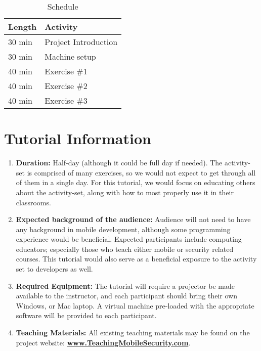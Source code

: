 \documentclass[titlepage]{article}
\begin{document}
%


\begin{table}[ht]%
\begin{center}
\caption{Schedule}
\label{Table:apkcontents}
  \begin{tabular}{| l | l | } \hline

    \bfseries Length & \bfseries Activity \\ \hline
    30 min & Project Introduction \\ \hline
    30 min & Machine setup \\ \hline
    40 min & Exercise \#1 \\ \hline
    40 min & Exercise \#2 \\ \hline
    40 min & Exercise \#3 \\ \hline

  \end{tabular}
  \end{center}
\end{table}









\section{Tutorial Information}

\begin{enumerate}
	\item \textbf{Duration:} Half-day (although it could be full day if needed). The activity-set is comprised of many exercises, so we would not expect to get through all of them in a single day. For this tutorial, we would focus on educating others about the activity-set, along with how to most properly use it in their classrooms. 
	
	\item \textbf{Expected background of the audience:} Audience will not need to have any background in mobile development, although some programming experience would be beneficial. Expected participants include computing educators; especially those who teach either mobile or security related courses. This tutorial would also serve as a beneficial exposure to the activity set to developers as well.
	\item \textbf{Required Equipment:} The tutorial will require a projector be made available to the instructor, and each participant should bring their own Windows, or Mac laptop. A virtual machine pre-loaded with the appropriate software will be provided to each participant.
	
	
	\item \textbf{Teaching Materials:} All existing teaching materials may be found on the project website: \textbf{\url{www.TeachingMobileSecurity.com}}. %

\end{enumerate}
\end{document}
